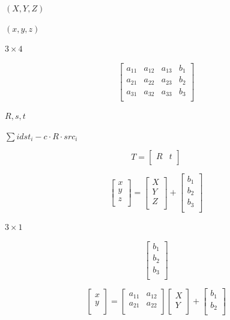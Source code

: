 \documentclass{article}
\begin{document}
$(X,Y,Z)$
\pagebreak

$(x,y,z)$
\pagebreak

$3 \times 4$
\pagebreak

\[\begin{bmatrix}
a_{11} & a_{12} & a_{13} & b_1\\
a_{21} & a_{22} & a_{23} & b_2\\
a_{31} & a_{32} & a_{33} & b_3\\
\end{bmatrix}
\]
\pagebreak

$R,s,t$
\pagebreak

$\sum{i} dst_i - c \cdot R \cdot src_i $
\pagebreak

\[T =
\begin{bmatrix}
R & t\\
\end{bmatrix}
\]
\pagebreak

\[\begin{bmatrix}
x\\
y\\
z\\
\end{bmatrix}
=
\begin{bmatrix}
X\\
Y\\
Z\\
\end{bmatrix}
+
\begin{bmatrix}
b_1\\
b_2\\
b_3\\
\end{bmatrix}
\]
\pagebreak

$3 \times 1$
\pagebreak

\[\begin{bmatrix}
b_1 \\
b_2 \\
b_3 \\
\end{bmatrix}
\]
\pagebreak

\[\begin{bmatrix}
x\\
y\\
\end{bmatrix}
=
\begin{bmatrix}
a_{11} & a_{12}\\
a_{21} & a_{22}\\
\end{bmatrix}
\begin{bmatrix}
X\\
Y\\
\end{bmatrix}
+
\begin{bmatrix}
b_1\\
b_2\\
\end{bmatrix}
\]
\pagebreak
\end{document}
